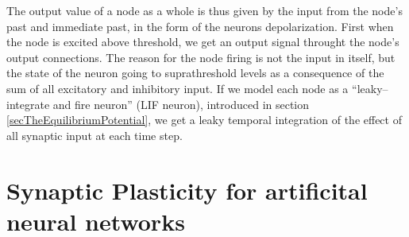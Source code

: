 The output value of a node as a whole is thus given by the input from the node's past and immediate past, in the form of the neurons depolarization.
First when the node is excited above threshold, we get an output signal throught the node's output connections.
The reason for the node firing is not the input in itself, but the state of the neuron going to suprathreshold levels as a consequence of the sum of all excitatory and inhibitory input.
If we model each node as a ``leaky--integrate and fire neuron'' (LIF neuron), introduced in section \ref{secTheEquilibriumPotential}, we get a leaky temporal integration of the effect of all synaptic input at each time step.
%









\section{Synaptic Plasticity for artificital neural networks}


